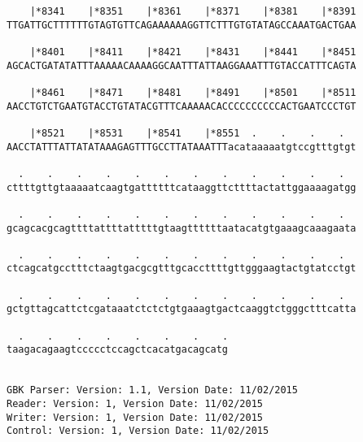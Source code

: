 \documentclass{article}
\begin{document}
\begin{Verbatim}
    |*8341    |*8351    |*8361    |*8371    |*8381    |*8391
TTGATTGCTTTTTTGTAGTGTTCAGAAAAAAGGTTCTTTGTGTATAGCCAAATGACTGAA
                                                            
    |*8401    |*8411    |*8421    |*8431    |*8441    |*8451
AGCACTGATATATTTAAAAACAAAAGGCAATTTATTAAGGAAATTTGTACCATTTCAGTA
                                                            
    |*8461    |*8471    |*8481    |*8491    |*8501    |*8511
AACCTGTCTGAATGTACCTGTATACGTTTCAAAAACACCCCCCCCCCACTGAATCCCTGT
                                                            
    |*8521    |*8531    |*8541    |*8551  .    .    .    .  
AACCTATTTATTATATAAAGAGTTTGCCTTATAAATTTacataaaaatgtccgtttgtgt
                                                            
  .    .    .    .    .    .    .    .    .    .    .    .  
cttttgttgtaaaaatcaagtgattttttcataaggttcttttactattggaaaagatgg
                                                            
  .    .    .    .    .    .    .    .    .    .    .    .  
gcagcacgcagttttattttatttttgtaagttttttaatacatgtgaaagcaaagaata
                                                            
  .    .    .    .    .    .    .    .    .    .    .    .  
ctcagcatgcctttctaagtgacgcgtttgcaccttttgttgggaagtactgtatcctgt
                                                            
  .    .    .    .    .    .    .    .    .    .    .    .  
gctgttagcattctcgataaatctctctgtgaaagtgactcaaggtctgggctttcatta
                                                            
  .    .    .    .    .    .    .    .
taagacagaagtccccctccagctcacatgacagcatg
                                      
                                      
GBK Parser: Version: 1.1, Version Date: 11/02/2015
Reader: Version: 1, Version Date: 11/02/2015
Writer: Version: 1, Version Date: 11/02/2015
Control: Version: 1, Version Date: 11/02/2015
\end{Verbatim}
\end{document}
